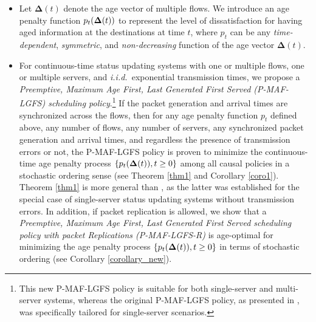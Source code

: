\begin{itemize}
\item Let $\bm{\Delta}(t)$ denote the age vector of multiple flows. We introduce an age penalty function $p_t (\bm{\Delta}(t))$ to represent the level of dissatisfaction for having aged information at the destinations at time $t$, where $p_t$ can be any \emph{time-dependent}, \emph{symmetric}, and \emph{non-decreasing} function of the age vector $\bm{\Delta}(t)$. 

\item For continuous-time status updating systems with one or multiple flows, one or multiple servers, and \emph{i.i.d.}~exponential transmission times, we propose a \emph{Preemptive, Maximum Age First, Last Generated First Served (P-MAF-LGFS) scheduling policy}.\footnote{
This new P-MAF-LGFS policy is suitable for both single-server and multi-server systems, whereas the original P-MAF-LGFS policy, as presented in \cite{SunAoIWorkshop2018}, was specifically tailored for single-server scenarios. 
} 
If the packet generation and arrival times are synchronized across the flows, then for any age penalty function $p_t$ defined above, any number of flows, any number of servers, any synchronized packet generation and arrival times, and regardless the presence of transmission errors or not, the P-MAF-LGFS policy is proven to minimize the continuous-time age penalty process $\{p_t (\bm{\Delta}(t)), t\geq 0\}$ among all causal policies in a stochastic ordering sense (see Theorem \ref{thm1} and Corollary \ref{coro1}). Theorem \ref{thm1} is more general than \cite[Theorem 1]{SunAoIWorkshop2018}, as the latter was established for the special case of single-server status updating systems without transmission errors. In addition, if packet replication is allowed, we show that a \emph{Preemptive, Maximum Age First, Last Generated First Served scheduling policy with packet Replications (P-MAF-LGFS-R)} is age-optimal for minimizing the age penalty process $\{p_t (\bm{\Delta}(t)), t\geq 0\}$ in terms of stochastic ordering (see Corollary \ref{corollary_new}). 



\end{itemize}
